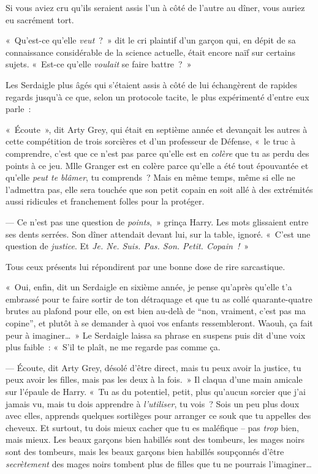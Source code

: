 \later

Si vous aviez cru qu'ils seraient assis l'un à côté de l'autre au dîner, vous auriez eu sacrément tort.

«~Qu'est-ce qu'elle \emph{veut}~?~»
dit le cri plaintif d'un garçon qui, en dépit de sa connaissance considérable de la science actuelle, était encore naïf sur certains sujets.
«~Est-ce qu'elle \emph{voulait} se faire battre~?~»

Les Serdaigle plus âgés qui s'étaient assis à côté de lui échangèrent de rapides regards jusqu'à ce que, selon un protocole tacite, le plus expérimenté d'entre eux parle~:

«~Écoute~», dit Arty Grey, qui était en septième année et devançait les autres à cette compétition de trois sorcières et d'un professeur de Défense, «~le truc à comprendre, c'est que ce n'est pas parce qu'elle est en \emph{colère} que tu as perdu des points à ce jeu.
Mlle Granger est en colère parce qu'elle a été tout épouvantée et qu'elle \emph{peut te blâmer}, tu comprends~?
Mais en même temps, même si elle ne l'admettra pas, elle sera touchée que son petit copain en soit allé à des extrémités aussi ridicules et franchement folles pour la protéger.

--- Ce n'est pas une question de \emph{points},~» grinça Harry.
Les mots glissaient entre ses dents serrées.
Son dîner attendait devant lui, sur la table, ignoré.
«~C'est une question de \emph{justice}.
Et \emph{Je.
Ne. Suis.
Pas. Son.
Petit. Copain~!}~»

Tous ceux présents lui répondirent par une bonne dose de rire sarcastique.

«~Oui, enfin, dit un Serdaigle en sixième année, je pense qu'après qu'elle t'a embrassé pour te faire sortir de ton détraquage et que tu as collé quarante-quatre brutes au plafond pour elle, on est bien au-delà de “non, vraiment, c'est pas ma copine”, et plutôt à se demander à quoi vos enfants ressembleront.
Waouh, ça fait peur à imaginer…~»
Le Serdaigle laissa sa phrase en suspens puis dit d'une voix plus faible~: «~S'il te plaît, ne me regarde pas comme ça.

--- Écoute, dit Arty Grey, désolé d'être direct, mais tu peux avoir la justice, tu peux avoir les filles, mais pas les deux à la fois.~»
Il claqua d'une main amicale sur l'épaule de Harry.
«~Tu as du potentiel, petit, plus qu'aucun sorcier que j'ai jamais vu, mais tu dois apprendre à \emph{l'utiliser}, tu vois~?
Sois un peu plus doux avec elles, apprends quelques sortilèges pour arranger ce souk que tu appelles des cheveux.
Et surtout, tu dois mieux cacher que tu es maléfique -- pas \emph{trop} bien, mais mieux.
Les beaux garçons bien habillés sont des tombeurs, les mages noirs sont des tombeurs, mais les beaux garçons bien habillés soupçonnés d'être \emph{secrètement} des mages noirs tombent plus de filles que tu ne pourrais l'imaginer…

